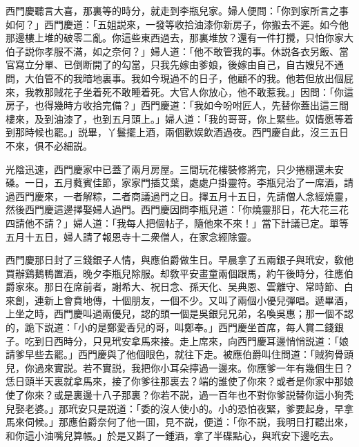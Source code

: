 西門慶聽言大喜，那裏等的時分，就走到李瓶兒家。婦人便問：「你到家所言之事如何？」西門慶道：「五姐説來，一發等收拾油漆你新房子，你搬去不遲。如今他那邊樓上堆的破零二亂。你這些東西過去，那裏堆放？還有一件打攪，只怕你家大伯子説你孝服不滿，如之奈何？」婦人道：「他不敢管我的事。休説各衣另飯、當官寫立分單、已倒断開了的勾當，只我先嫁由爹娘，後嫁由自己，自古嫂兒不通問，大伯管不的我暗地裏事。我如今現過不的日子，他顧不的我。他若但放出個屁來，我教那賊花子坐着死不敢睡着死。大官人你放心，他不敢惹我。」因問：「你這房子，也得幾時方收拾完備？」西門慶道：「我如今吩咐匠人，先替你蓋出這三間樓來，及到油漆了，也到五月頭上。」婦人道：「我的哥哥，你上緊些。奴情愿等着到那時候也罷。」説畢，丫鬟擺上酒，兩個歡娱飲酒過夜。西門慶自此，沒三五日不來，俱不必細説。

光陰迅速，西門慶家中已蓋了兩月房屋。三間玩花樓裝修將完，只少捲棚還未安磉。一日，五月蕤賓佳節，家家門插艾葉，處處户掛靈符。李瓶兒治了一席酒，請過西門慶來，一者解粽，二者商議過門之日。擇五月十五日，先請僧人念經燒靈，然後西門慶這邊擇娶婦人過門。西門慶因問李瓶兒道：「你燒靈那日，花大花三花四請他不請？」婦人道：「我每人把個帖子，隨他來不來！」當下計議已定。單等五月十五日，婦人請了報恩寺十二衆僧人，在家念經除靈。

西門慶那日封了三錢銀子人情，與應伯爵做生日。早晨拿了五兩銀子與玳安，敎他買辦鷄鵝鴨置酒，晚夕李瓶兒除服。却敎平安畫童兩個跟馬，約午後時分，往應伯爵家來。那日在席前者，謝希大、祝日念、孫天化、吴典恩、雲離守、常時節、白來創，連新上會賁地傳，十個朋友，一個不少。又叫了兩個小優兒彈唱。遞畢酒，上坐之時，西門慶叫過兩優兒，認的頭一個是吳銀兒兄弟，名喚吳惠；那一個不認的，跪下説道：「小的是鄭愛香兒的哥，叫鄭奉。」西門慶坐首席，每人賞二錢銀子。吃到日西時分，只見玳安拿馬來接。走上席來，向西門慶耳邊悄悄説道：「娘請爹早些去罷。」西門慶與了他個眼色，就往下走。被應伯爵叫住問道：「賊狗骨頭兒，你過來實説。若不實説，我把你小耳朵擰過一邊來。你應爹一年有幾個生日？恁日頭半天裏就拿馬來，接了你爹往那裏去？端的誰使了你來？或者是你家中那娘使了你來？或是裏邊十八子那裏？你若不説，過一百年也不對你爹説替你這小狗秃兒娶老婆。」那玳安只是説道：「委的沒人使小的。小的恐怕夜緊，爹要起身，早拿馬來伺候。」那應伯爵奈何了他一囬，見不説，便道：「你不説，我明日打聽出來，和你這小油嘴兒算帳。」於是又斟了一鍾酒，拿了半碟點心，與玳安下邊吃去。

